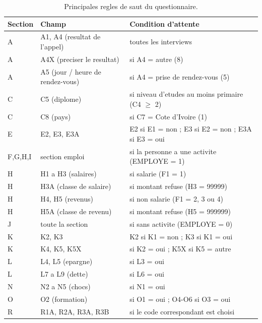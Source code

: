 \documentclass[11pt,a4paper]{article}
\begin{document}
\begin{table}[h]
\centering
\caption{Principales regles de saut du questionnaire.}
\label{tab:regles}
\small
\begin{tabular}{L{1.6cm}L{4.4cm}L{6.8cm}}
\toprule
\textbf{Section} & \textbf{Champ} & \textbf{Condition d'attente} \\
\midrule
A & A1, A4 (resultat de l'appel) & toutes les interviews \\
A & A4X (preciser le resultat)    & si A4 = autre (8) \\
A & A5 (jour / heure de rendez-vous) & si A4 = prise de rendez-vous (5) \\
C & C5 (diplome)                  & si niveau d'etudes au moins primaire (C4 $\geq$ 2) \\
C & C8 (pays)                     & si C7 = Cote d'Ivoire (1) \\
E & E2, E3, E3A                   & E2 si E1 = non ; E3 si E2 = non ; E3A si E3 = oui \\
F,G,H,I & section emploi           & si la personne a une activite (EMPLOYE = 1) \\
H & H1 a H3 (salaires)            & si salarie (F1 = 1) \\
H & H3A (classe de salaire)       & si montant refuse (H3 = 99999) \\
H & H4, H5 (revenus)              & si non salarie (F1 = 2, 3 ou 4) \\
H & H5A (classe de revenu)        & si montant refuse (H5 = 999999) \\
J & toute la section              & si sans activite (EMPLOYE = 0) \\
K & K2, K3                        & K2 si K1 = non ; K3 si K1 = oui \\
K & K4, K5, K5X                   & si K2 = oui ; K5X si K5 = autre \\
L & L4, L5 (epargne)              & si L3 = oui \\
L & L7 a L9 (dette)               & si L6 = oui \\
N & N2 a N5 (chocs)               & si N1 = oui \\
O & O2 (formation)                & si O1 = oui ; O4-O6 si O3 = oui \\
R & R1A, R2A, R3A, R3B            & si le code correspondant est choisi \\
\bottomrule
\end{tabular}
\end{table}

\end{document}
